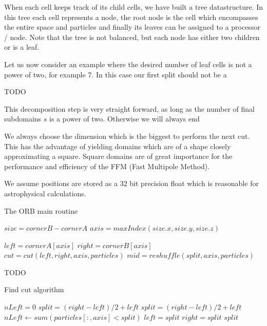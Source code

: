 \documentclass[]{article}
\begin{document}
\vspace{5mm}

When each cell keeps track of its child cells, we have built a tree datastructure. In this tree each cell represents a node, the root node is the cell which encompasses the entire space and particles and finally its leaves can be assigned to a processor / node. Note that the tree is not balanced, but each node has either two children or is a leaf. 


\vspace{5mm}

Let us now consider an example where the desired number of leaf cells is not a power of two, for example 7. In this case our first split should not be a 

TODO

This decomposition step is very straight forward, as long as the number of final subdomains $s$ is a power of two. Otherwise we will always end 

We always choose the dimension which is the biggest to perform the next cut. This has the advantage of yielding domains which are of a shape closely approximating a square. Square domains are of great importance for the performance and efficiency of the FFM (Fast Multipole Method).

We assume positions are stored as a 32 bit precision float which is reasonable for astrophysical calculations. 
\begin{algorithm}[H]
	\caption{The ORB main routine}\label{euclid}
	\begin{algorithmic}[1]
		\State $size = cornerB - cornerA$
		\State $axis = maxIndex(size.x, size.y, size.z)$ 
		
		\State $left = cornerA[axis]$
		\State $right = cornerB[axis]$
		\newline
		\State $cut = cut(left, right, axis, particles)$
		\State $mid = reshuffle(split, axis, particles)$
		\newline
		
		TODO
		\State {}
		\EndProcedure
	\end{algorithmic}
\end{algorithm}

\begin{algorithm}[H]
	\caption{Find cut algorithm}\label{euclid}
	\begin{algorithmic}[1]
		\State $nLeft = 0$
		\State $split = (right - left) / 2 + left $ 
		\State $split = (right - left) / 2 + left $
		\State $nLeft\gets sum(particles[:,axis] < split)$
		\State $left = split$
		\Else 
		\State $right = split$
		\EndIf
		\EndWhile\label{euclidendwhile}
		\State \Return $split$
		\EndProcedure
	\end{algorithmic}
\end{algorithm}
\end{document}
